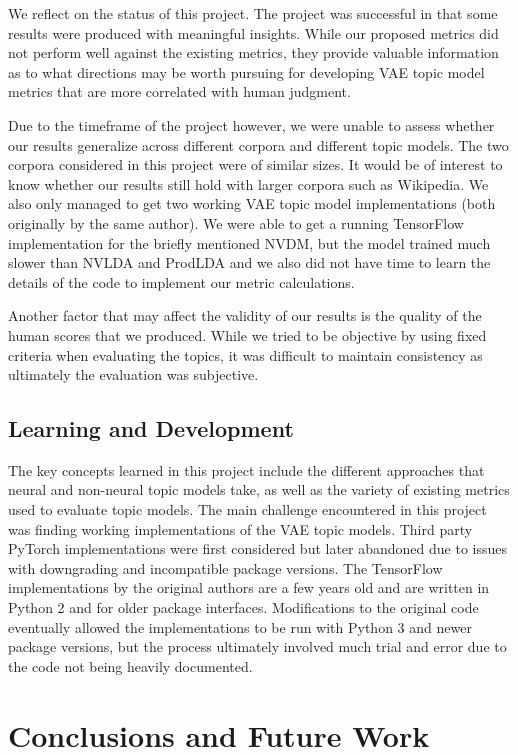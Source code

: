 \documentclass[10pt]{article}
\begin{document}
We reflect on the status of this project. The project was successful in that some results were produced with meaningful insights. While our proposed metrics did not perform well against the existing metrics, they provide valuable information as to what directions may be worth pursuing for developing VAE topic model metrics that are more correlated with human judgment.

Due to the timeframe of the project however, we were unable to assess whether our results generalize across different corpora and different topic models. The two corpora considered in this project were of similar sizes. It would be of interest to know whether our results still hold with larger corpora such as Wikipedia. We also only managed to get two working VAE topic model implementations (both originally by the same author). We were able to get a running TensorFlow implementation for the briefly mentioned NVDM, but the model trained much slower than NVLDA and ProdLDA and we also did not have time to learn the details of the code to implement our metric calculations.

Another factor that may affect the validity of our results is the quality of the human scores that we produced. While we tried to be objective by using fixed criteria when evaluating the topics, it was difficult to maintain consistency as ultimately the evaluation was subjective.

\subsection{Learning and Development}

The key concepts learned in this project include the different approaches that neural and non-neural topic models take, as well as the variety of existing metrics used to evaluate topic models. The main challenge encountered in this project was finding working implementations of the VAE topic models. Third party PyTorch implementations were first considered but later abandoned due to issues with downgrading and incompatible package versions. The TensorFlow implementations by the original authors are a few years old and are written in Python 2 and for older package interfaces. Modifications to the original code eventually allowed the implementations to be run with Python 3 and newer package versions, but the process ultimately involved much trial and error due to the code not being heavily documented.


\section{Conclusions and Future Work}\label{sec:conclusion}
\end{document}
